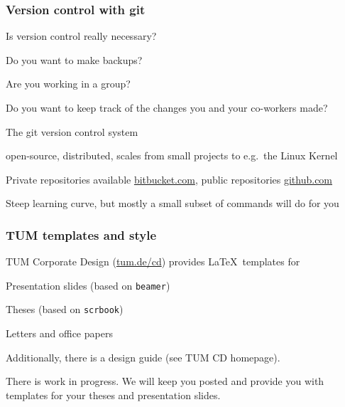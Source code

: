 \documentclass{tum-presentation}
\begin{document}
\begin{frame}
  \frametitle{Version control with git}

  Is version control really necessary?
  \begin{PraesentationAufzaehlung}
  \item Do you want to make backups?
  \item Are you working in a group?
  \item Do you want to keep track of the changes you and your co-workers made?
  \end{PraesentationAufzaehlung}

  The git version control system
  \begin{PraesentationAufzaehlung}
  \item open-source, distributed, scales from small projects to e.g.\ the Linux Kernel
  \item Private repositories available \@\url{bitbucket.com}, public repositories \@\url{github.com}
  \item Steep learning curve, but mostly a small subset of commands will do for you
  \end{PraesentationAufzaehlung}

\end{frame}

\begin{frame}
  \frametitle{TUM templates and style}

  TUM Corporate Design (\url{tum.de/cd}) provides \LaTeX~templates for
  \begin{PraesentationAufzaehlung}
  \item Presentation slides (based on \texttt{beamer})
  \item Theses (based on \texttt{scrbook})
  \item Letters and office papers
  \end{PraesentationAufzaehlung}

  Additionally, there is a design guide (see TUM CD homepage).

  There is work in progress. We will keep you posted and provide you with templates for your theses and presentation slides.
\end{frame}
\end{document}

